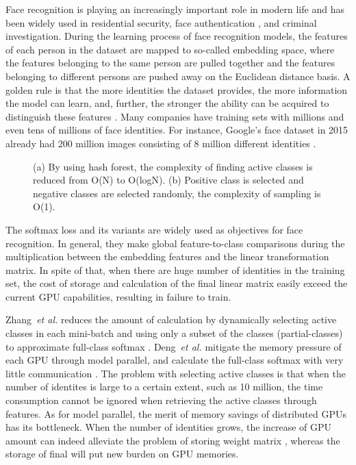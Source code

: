 \documentclass[letterpaper]{article} \usepackage{style/aaai21}  \usepackage{times}  \usepackage{helvet} \usepackage{courier}  \usepackage[hyphens]{url}  \usepackage{graphicx} \usepackage{color}
\begin{document}
Face recognition is playing an increasingly important role in modern life and has been widely used in residential security, face authentication \cite{wang2015face}, and criminal investigation. During the learning process of face recognition models, the features of each person in the dataset are mapped to so-called embedding space, where the features belonging to the same person are pulled together and the features belonging to different persons are pushed away on the Euclidean distance basis. A golden rule is that the more identities the dataset provides, the more information the model can learn, and, further, the stronger the ability can be acquired to distinguish these features \cite{cao2018celeb,deng2019arcface}. Many companies have training sets with millions and even tens of millions of face identities. For instance, Google’s face dataset in 2015 already had 200 million images consisting of 8 million different identities \cite{schroff2015facenet}.
\begin{figure}[t]
	\centering
	\caption{ (a) By using hash forest, the complexity of finding active classes is reduced from O(N) to O(logN). (b) Positive class is selected and negative classes are selected randomly, the complexity of sampling is O(1).}
	\label{fig1}
\end{figure}


The softmax loss and its variants \cite{wang2018cosface,deng2019arcface,wang2018additive,liu2017sphereface} are widely used as objectives for face recognition. In general, they make global feature-to-class comparisons during the multiplication between the embedding features and the linear transformation matrix. In spite of that, when there are huge number of identities in the training set, the cost of storage and calculation of the final linear matrix easily exceed the current GPU capabilities, resulting in failure to train.
  
Zhang~\emph{et al.} reduces the amount of calculation by dynamically selecting active classes in each mini-batch and using only a subset of the classes (partial-classes) to approximate full-class softmax \cite{zhang2018accelerated}. Deng~\emph{et al.}  mitigate the memory pressure of each GPU through model parallel, and calculate the full-class softmax with very little communication \cite{deng2019arcface}. The problem with selecting active classes is that when the number of identites is large to a certain extent, such as 10 million, the time consumption cannot be ignored when retrieving the active classes through features. As for model parallel, the merit of memory savings of distributed GPUs has its bottleneck. When the number of identities grows, the increase of GPU amount can indeed alleviate the problem of storing weight matrix , whereas the storage of final  will put new burden on GPU memories.
\end{document}
